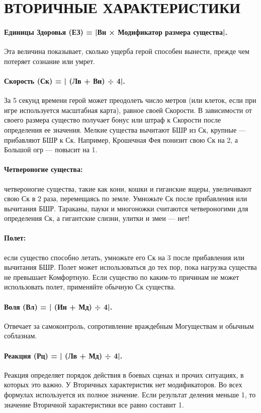 %

\section{ВТОРИЧНЫЕ ХАРАКТЕРИСТИКИ}
\paragraph{Единицы Здоровья (ЕЗ) = |Вн × Модификатор размера существа|.} Эта величина показывает, сколько ущерба герой способен вынести, прежде чем потеряет сознание или умрет.
\paragraph{Скорость (Ск) = | (Лв + Вн) ÷ 4|.} За 5 секунд времени герой может преодолеть число метров (или клеток, если при игре используется масштабная карта), равное своей Скорости.
\newline
В зависимости от своего размера существо получает бонус или штраф к Скорости после определения ее значения. Мелкие существа вычитают БШР из Ск, крупные — прибавляют БШР к Ск. Например, Крошечная Фея понизит свою Ск на 2, а Большой огр — повысит на 1.
\paragraph{Четвероногие существа:} четвероногие существа, такие как кони, кошки и гиганские ящеры, увеличивают свою Ск в 2 раза, перемещаясь по земле. Умножьте Ск после прибавления или вычитания БШР. Тараканы, пауки и многоножки считаются четвероногими для определения Ск, а гигантские слизни, улитки и змеи — нет!
\paragraph{Полет:} если существо способно летать, умножьте его Ск на 3 после прибавления или вычитания БШР. Полет может использоваться до тех пор, пока нагрузка существа не превышает Комфортную. Если существо по каким-то причинам не может использовать полет, применяйте обычную Ск существа.
\paragraph{Воля (Вл) = | (Ин + Мд) ÷ 4|.} Отвечает за самоконтроль, сопротивление враждебным Могуществам и обычным соблазнам.
\paragraph{Реакция (Рц) = | (Лв + Мд) ÷ 4|.} Реакция определяет порядок действия в боевых сценах и прочих ситуациях, в которых это важно. У Вторичных характеристик нет модификаторов. Во всех формулах используется их полное значение. Если результат деления меньше 1, то значение Вторичной характеристики все равно составит 1.
